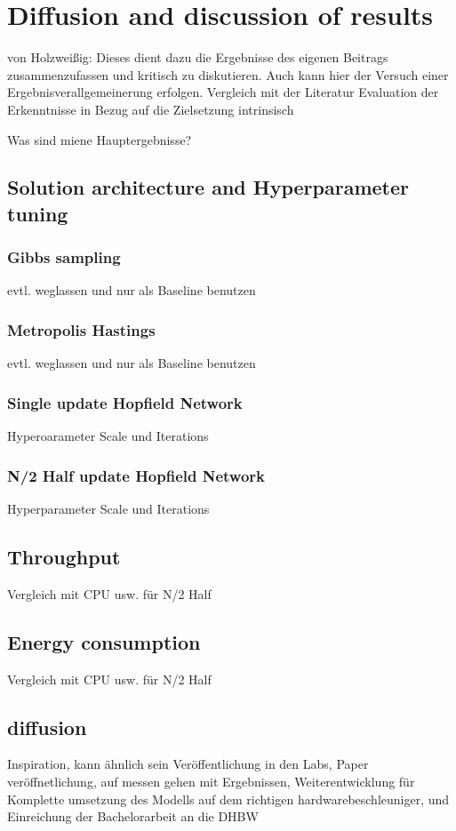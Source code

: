 \chapter{Diffusion and discussion of results}

von Holzweißig: Dieses dient dazu die Ergebnisse des eigenen Beitrags zusammenzufassen
und kritisch zu diskutieren. Auch kann hier der Versuch einer Ergebnisverallgemeinerung
erfolgen. Vergleich mit der Literatur
Evaluation der Erkenntnisse in Bezug auf die Zielsetzung intrinsisch

Was sind miene Hauptergebnisse? 
\section{Solution architecture and Hyperparameter tuning}
\subsection{Gibbs sampling}
evtl. weglassen und nur als Baseline benutzen
\subsection{Metropolis Hastings}
evtl. weglassen und nur als Baseline benutzen
\subsection{Single update Hopfield Network}
Hyperoarameter Scale und Iterations
\subsection{N/2 Half update Hopfield Network}
Hyperparameter Scale und Iterations
\section{Throughput}
Vergleich mit CPU usw. für N/2 Half
\section{Energy consumption}
Vergleich mit CPU usw. für N/2 Half
\section{diffusion}
Inspiration, kann ähnlich sein
Veröffentlichung in den Labs, Paper veröffnetlichung, auf messen gehen mit Ergebnissen,
Weiterentwicklung für Komplette umsetzung des Modells auf dem richtigen hardwarebeschleuniger,
und Einreichung der Bachelorarbeit an die DHBW
